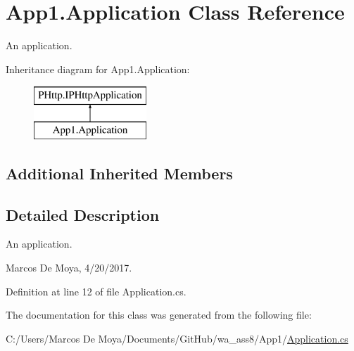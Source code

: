 \hypertarget{class_app1_1_1_application}{}\section{App1.\+Application Class Reference}
\label{class_app1_1_1_application}


An application.  


Inheritance diagram for App1.\+Application\+:\begin{figure}[H]
\begin{center}
\leavevmode
\includegraphics[height=2.000000cm]{class_app1_1_1_application}
\end{center}
\end{figure}
\subsection*{Additional Inherited Members}


\subsection{Detailed Description}
An application. 

Marcos De Moya, 4/20/2017. 

Definition at line 12 of file Application.\+cs.



The documentation for this class was generated from the following file\+:\begin{DoxyCompactItemize}
\item 
C\+:/\+Users/\+Marcos De Moya/\+Documents/\+Git\+Hub/wa\+\_\+ass8/\+App1/\hyperlink{_app1_2_application_8cs}{Application.\+cs}\end{DoxyCompactItemize}
